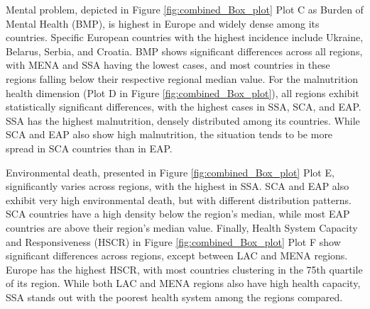 Mental problem, depicted in Figure \ref{fig:combined_Box_plot} Plot C as Burden of Mental Health (BMP), is highest in Europe and widely dense among its countries. Specific European countries with the highest incidence include Ukraine, Belarus, Serbia, and Croatia. BMP shows significant differences across all regions, with MENA and SSA having the lowest cases, and most countries in these regions falling below their respective regional median value. For the malnutrition health dimension (Plot D in Figure \ref{fig:combined_Box_plot}), all regions exhibit statistically significant differences, with the highest cases in SSA, SCA, and EAP. SSA has the highest malnutrition, densely distributed among its countries. While SCA and EAP also show high malnutrition, the situation tends to be more spread in SCA countries than in EAP.

Environmental death, presented in Figure \ref{fig:combined_Box_plot} Plot E, significantly varies across regions, with the highest in SSA. SCA and EAP also exhibit very high environmental death, but with different distribution patterns. SCA countries have a high density below the region's median, while most EAP countries are above their region's median value. Finally, Health System Capacity and Responsiveness (HSCR) in Figure \ref{fig:combined_Box_plot} Plot F show significant differences across regions, except between LAC and MENA regions. Europe has the highest HSCR, with most countries clustering in the 75th quartile of its region. While both LAC and MENA regions also have high health capacity, SSA stands out with the poorest health system among the regions compared.






